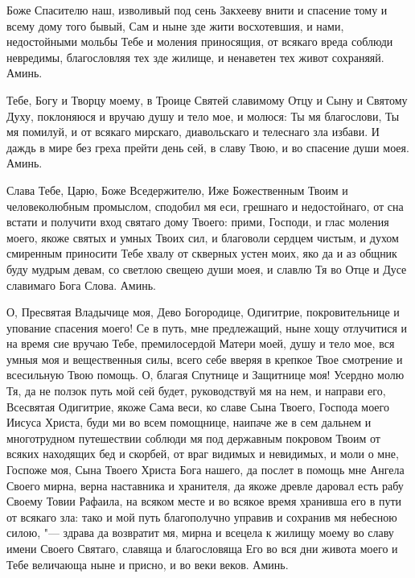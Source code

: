 \mychapterending

 


Боже Спасителю наш, изволивый под сень Закхееву внити и спасение тому и всему дому того бывый, Сам и ныне зде жити восхотевшия, и нами, недостойными мольбы Тебе и моления приносящия, от всякаго вреда соблюди невредимы, благословляя тех зде жилище, и ненаветен тех живот сохраняяй. Аминь. 



\mychapterending

 


Тебе, Богу и Творцу моему, в Троице Святей славимому Отцу и Сыну и Святому Духу, поклоняюся и вручаю душу и тело мое, и молюся: Ты мя благослови, Ты мя помилуй, и от всякаго мирскаго, диавольскаго и телеснаго зла избави. И даждь в мире без греха прейти день сей, в славу Твою, и во спасение души моея. Аминь.


Слава Тебе, Царю, Боже Вседержителю, Иже Божественным Твоим и человеколюбным промыслом, сподобил мя еси, грешнаго и недостойнаго, от сна встати и получити вход святаго дому Твоего: прими, Господи, и глас моления моего, якоже святых и умных Твоих сил, и благоволи сердцем чистым, и духом смиренным приносити Тебе хвалу от скверных устен моих, яко да и аз общник буду мудрым девам, со светлою свещею души моея, и славлю Тя во Отце и Дусе славимаго Бога Слова. Аминь.



\mychapterending

 


О, Пресвятая Владычице моя, Дево Богородице, Одигитрие, покровительнице и упование спасения моего! Се в путь, мне предлежащий, ныне хощу отлучитися и на время сие вручаю Тебе, премилосердой Матери моей, душу и тело мое, вся умныя моя и вещественныя силы, всего себе вверяя в крепкое Твое смотрение и всесильную Твою помощь. О, благая Спутнице и Защитнице моя! Усердно молю Тя, да не ползок путь мой сей будет, руководствуй мя на нем, и направи его, Всесвятая Одигитрие, якоже Сама веси, ко славе Сына Твоего, Господа моего Иисуса Христа, буди ми во всем помощнице, наипаче же в сем дальнем и многотрудном путешествии соблюди мя под державным покровом Твоим от всяких находящих бед и скорбей, от враг видимых и невидимых, и моли о мне, Госпоже моя, Сына Твоего Христа Бога нашего, да послет в помощь мне Ангела Своего мирна, верна наставника и хранителя, да якоже древле даровал есть рабу Своему Товии Рафаила, на всяком месте и во всякое время хранивша его в пути от всякаго зла: тако и мой путь благополучно управив и сохранив мя небесною силою, "--- здрава да возвратит мя, мирна и всецела к жилищу моему во славу имени Своего Святаго, славяща и благословяща Его во вся дни живота моего и Тебе величающа ныне и присно, и во веки веков. Аминь.
\longpage{}\mychapterending

